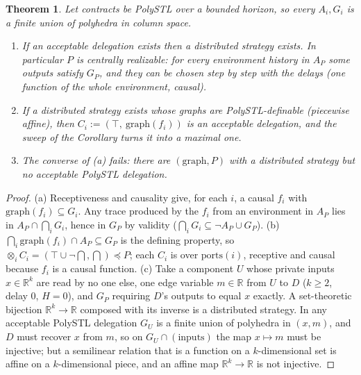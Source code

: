 \documentclass[10pt]{article}
\theoremstyle{plain}\newtheorem{theorem}{Theorem}\newtheorem{lemma}{Lemma}\newtheorem{proposition}{Proposition}\newtheorem{corollary}{Corollary}
\theoremstyle{definition}\newtheorem{definition}{Definition}
\newcommand{\refines}{\preccurlyeq}\newcommand{\comp}{\otimes}\newcommand{\Tr}{\mathrm{Tr}}
\newcommand{\ports}{\mathrm{ports}}\newcommand{\inp}{\mathrm{in}}\newcommand{\outp}{\mathrm{out}}
\begin{document}
\begin{theorem}\label{thm:exist}
Let contracts be PolySTL over a bounded horizon, so every $A_i,G_i$ is a finite union of polyhedra in column space.
\begin{enumerate}[label=(\alph*)]
\item If an acceptable delegation exists then a distributed strategy exists. In particular $P$ is \emph{centrally realizable}: for every environment history in $A_P$ some outputs satisfy $G_P$, and they can be chosen step by step with the delays (one function of the whole environment, causal).
\item If a distributed strategy exists whose graphs are PolySTL-definable (piecewise affine), then $C_i:=(\top,\ \mathrm{graph}(f_i))$ is an acceptable delegation, and the sweep of the Corollary turns it into a maximal one.
\item The converse of (a) fails: there are $(\text{graph},P)$ with a distributed strategy but no acceptable PolySTL delegation.
\end{enumerate}
\end{theorem}
\begin{proof}
(a) Receptiveness and causality give, for each $i$, a causal $f_i$ with $\mathrm{graph}(f_i)\subseteq G_i$. Any trace produced by the $f_i$ from an environment in $A_P$ lies in $A_P\cap\bigcap_iG_i$, hence in $G_P$ by validity ($\bigcap_iG_i\subseteq\neg A_P\cup G_P$).
(b) $\bigcap_i\mathrm{graph}(f_i)\cap A_P\subseteq G_P$ is the defining property, so $\comp_iC_i=(\top\cup\neg\bigcap,\bigcap)\refines P$; each $C_i$ is over $\ports(i)$, receptive and causal because $f_i$ is a causal function.
(c) Take a component $U$ whose private inputs $x\in\mathbb R^k$ are read by no one else, one edge variable $m\in\mathbb R$ from $U$ to $D$ ($k\ge2$, delay $0$, $H=0$), and $G_P$ requiring $D$'s outputs to equal $x$ exactly. A set-theoretic bijection $\mathbb R^k\to\mathbb R$ composed with its inverse is a distributed strategy. In any acceptable PolySTL delegation $G_U$ is a finite union of polyhedra in $(x,m)$, and $D$ must recover $x$ from $m$, so on $G_U\cap(\text{inputs})$ the map $x\mapsto m$ must be injective; but a semilinear relation that is a function on a $k$-dimensional set is affine on a $k$-dimensional piece, and an affine map $\mathbb R^k\to\mathbb R$ is not injective.
\end{proof}
\end{document}
